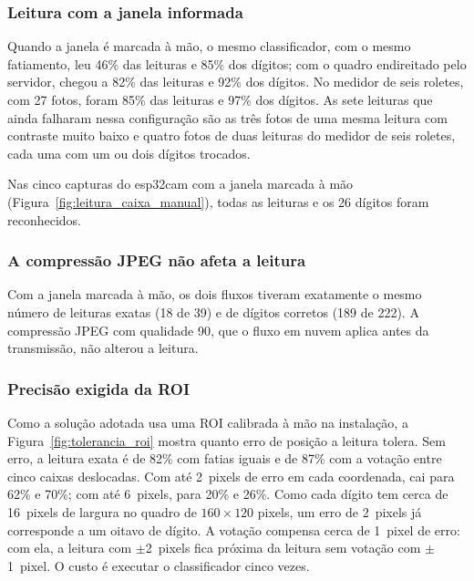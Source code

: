 \subsubsection{Leitura com a janela informada}

Quando a janela é marcada à mão, o mesmo classificador, com o mesmo fatiamento, leu 46\%
das leituras e 85\% dos dígitos; com o quadro endireitado pelo servidor, chegou a 82\% das
leituras e 92\% dos dígitos. No medidor de seis roletes, com 27 fotos, foram 85\% das
leituras e 97\% dos dígitos. As sete leituras que ainda falharam
nessa configuração são as três fotos de uma mesma leitura com contraste muito baixo e
quatro fotos de duas leituras do medidor de seis roletes, cada uma com um ou dois dígitos
trocados.

Nas cinco capturas do \gls{esp32cam} com a janela marcada à mão
(Figura~\ref{fig:leitura_caixa_manual}), todas as leituras e os 26 dígitos foram
reconhecidos.

\subsubsection{A compressão JPEG não afeta a leitura}

Com a janela marcada à mão, os dois fluxos tiveram exatamente o mesmo número de leituras
exatas (18 de 39) e de dígitos corretos (189 de 222). A compressão JPEG com qualidade 90,
que o fluxo em nuvem aplica antes da transmissão, não alterou a leitura.

\subsubsection{Precisão exigida da ROI}

Como a solução adotada usa uma ROI calibrada à mão na
instalação, a Figura~\ref{fig:tolerancia_roi} mostra quanto erro de posição a leitura
tolera. Sem erro, a leitura exata é de 82\% com fatias iguais e de 87\% com a votação entre
cinco caixas deslocadas. Com até 2~pixels de erro em cada coordenada, cai para 62\% e 70\%;
com até 6~pixels, para 20\% e 26\%. Como cada dígito tem cerca de 16~pixels de largura no
quadro de $160 \times 120$ pixels, um erro de 2~pixels já corresponde a um oitavo de dígito.
A votação compensa cerca de 1~pixel de erro: com ela, a leitura com $\pm$2~pixels fica
próxima da leitura sem votação com $\pm$1~pixel. O custo é executar o classificador cinco
vezes.

